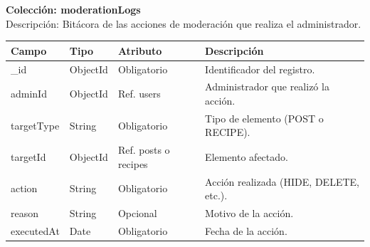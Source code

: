 \newpage
\noindent\textbf{Colección: moderationLogs} \\
Descripción: Bitácora de las acciones de moderación que realiza el administrador.
{\footnotesize
\renewcommand{\arraystretch}{1.2}
\begin{longtable}{|>{\raggedright\arraybackslash}p{4.7cm}|>{\raggedright\arraybackslash}p{1.8cm}|>{\raggedright\arraybackslash}p{2.3cm}|>{\raggedright\arraybackslash}p{5.4cm}|}
    \hline
    \rowcolor[HTML]{EFEFEF}
    \textbf{Campo} & \textbf{Tipo} & \textbf{Atributo} & \textbf{Descripción} \\ \hline
    \endhead
    \_id & ObjectId & Obligatorio & Identificador del registro. \\ \hline
    adminId & ObjectId & Ref. users & Administrador que realizó la acción. \\ \hline
    targetType & String & Obligatorio & Tipo de elemento (POST o RECIPE). \\ \hline
    targetId & ObjectId & Ref. posts o recipes & Elemento afectado. \\ \hline
    action & String & Obligatorio & Acción realizada (HIDE, DELETE, etc.). \\ \hline
    reason & String & Opcional & Motivo de la acción. \\ \hline
    executedAt & Date & Obligatorio & Fecha de la acción. \\ \hline
\end{longtable}
}

